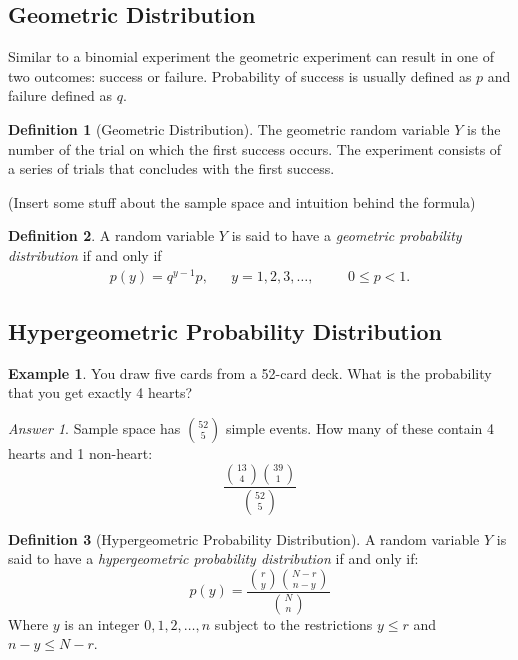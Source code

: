 \documentclass{article}
\theoremstyle{plain}
\theoremstyle{definition}
\newtheorem{defn}{Definition}[section]
\newtheorem{example}{Example}[section]
\theoremstyle{remark}
\newtheorem*{answer}{Answer}
\begin{document}
\subsection{Geometric Distribution}
Similar to a binomial experiment the geometric experiment can result in one of two outcomes: success or failure. Probability of success is usually defined as $p$ and failure defined as $q$.
\begin{defn}[Geometric Distribution]
The geometric random variable $Y$ is the number of the trial on which the first success occurs. The experiment consists of a series of trials that concludes with the first success.
\end{defn}
(Insert some stuff about the sample space and intuition behind the formula)
\begin{defn}
  A random variable $Y$ is said to have a \textit{geometric probability distribution} if and only if
\begin{align*}
  p(y) = q^{y-1}p, && y = 1,2,3,\ldots , &&& 0 \leq p < 1.
\end{align*}
\end{defn}

\subsection{Hypergeometric Probability Distribution}

\begin{example}
You draw five cards from a 52-card deck. What is the probability that you get exactly 4 hearts?
\end{example}
\begin{answer}
  Sample space has $52 \choose 5$ simple events. How many of these contain 4 hearts and 1 non-heart:
$$
\frac{ \displaystyle {13 \choose 4} {39 \choose 1} }%
{ \displaystyle {52 \choose 5} }
$$
\end{answer}


\begin{defn}[Hypergeometric Probability Distribution]
A random variable $Y$ is said to have a \textit{hypergeometric probability distribution} if and only if:
$$
p(y) = \frac{ \displaystyle {r \choose y} {N - r \choose n - y}} {\displaystyle {N \choose n}}
$$
Where $y$ is an integer $0,1,2,\ldots , n$ subject to the restrictions $y \leq r$ and $n - y \leq N - r$.
\end{defn}
\end{document}
